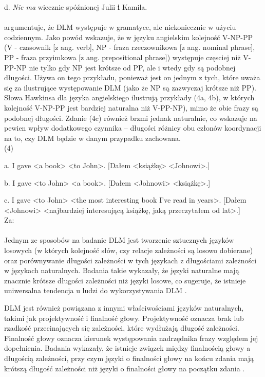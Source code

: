 \documentclass[licencjacka]{pracamgr_Kogni}
\begin{document}
d. \textit{Nie ma} wiecznie spóźnionej Julii \textbf{i} Kamila.
\\
\\
\citet{Hawkins1994} argumentuje, że DLM występuje w gramatyce, ale niekoniecznie w użyciu codziennym. Jako powód wskazuje, że w języku angielskim kolejność V-NP-PP (V - czasownik [z ang. verb], NP - fraza rzeczownikowa [z ang. nominal phrase], PP - fraza przyimkowa [z ang. prepositional phrase]) występuje częsciej niż V-PP-NP nie tylko gdy NP jest krótsze od PP, ale i wtedy gdy są podobnej długości. Używa on tego przykładu, ponieważ jest on jednym z tych, które uważa się za ilustrujące występowanie DLM (jako że NP są zazwyczaj krótsze niż PP). Słowa Hawkinsa dla języka angielskiego ilustrują przykłady (4a, 4b), w których kolejność V-NP-PP jest bardziej naturalna niż V-PP-NP), mimo że obie frazy są podobnej długości. Zdanie (4c) również brzmi jednak naturalnie, co wskazuje na pewien wpływ dodatkowego czynnika --  długości różnicy obu członów koordynacji na to, czy DLM będzie w danym przypadku zachowana.
\\

(4)

a. I gave <a book> <to John>. [Dałem <książkę> <Johnowi>.]

b. I gave <to John> <a book>. [Dałem <Johnowi> <książkę>.]

c. I gave <to John> <the most interesting book I've read in years>. [Dałem <Johnowi> <najbardziej interesującą książkę, jaką przeczytałem od lat>.]\\
Za: \citet{AnonimoweNieopublikowane}
\\
\\
Jednym ze sposobów na badanie DLM jest tworzenie sztucznych języków losowych (w których kolejność słów, czy relacje zależności są losowo dobierane) oraz porównywanie długości zależności w tych językach z długościami zależności w językach naturalnych. Badania takie wykazały, że języki naturalne mają znacznie krótsze długości zależności niż języki losowe, co sugeruje, że istnieje uniwersalna tendencja u ludzi do wykorzystywania DLM \citep{Liu2008,Ferrer2014}. 

DLM jest również powiązana z innymi właściwościami języków naturalnych, takimi jak projektywność i finalność głowy. Projektywność oznacza brak lub rzadkość przecinających się zależności, które wydłużają długość zależności. Finalność głowy oznacza kierunek występowania nadrzędnika frazy względem jej dopełnienia. Badania wykazały, że istnieje związek między finalnością głowy a długością zależności, przy czym języki o finalności głowy na końcu zdania mają krótszą długość zależności niż języki o finalności głowy na początku zdania \citep{FutrellEtAl2015}.
\end{document}
